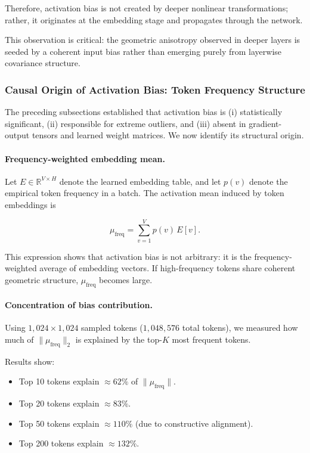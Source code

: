 Therefore, activation bias is not created by deeper nonlinear
transformations; rather, it originates at the embedding stage
and propagates through the network.

This observation is critical:
the geometric anisotropy observed in deeper layers is seeded
by a coherent input bias rather than emerging purely from
layerwise covariance structure.

\subsubsection{Causal Origin of Activation Bias: Token Frequency Structure}
\label{subsec:token_frequency_bias}

The preceding subsections established that activation bias is
(i) statistically significant,
(ii) responsible for extreme outliers,
and (iii) absent in gradient-output tensors and learned weight matrices.
We now identify its structural origin.

\paragraph{Frequency-weighted embedding mean.}

Let $E \in \mathbb{R}^{V \times H}$ denote the learned embedding table,
and let $p(v)$ denote the empirical token frequency in a batch.
The activation mean induced by token embeddings is

\[
\mu_{\text{freq}}
=
\sum_{v=1}^{V} p(v)\, E[v].
\]

This expression shows that activation bias is not arbitrary:
it is the frequency-weighted average of embedding vectors.
If high-frequency tokens share coherent geometric structure,
$\mu_{\text{freq}}$ becomes large.

\paragraph{Concentration of bias contribution.}

Using $1{,}024 \times 1{,}024$ sampled tokens
($1{,}048{,}576$ total tokens),
we measured how much of $\|\mu_{\text{freq}}\|_2$
is explained by the top-$K$ most frequent tokens.

Results show:

\begin{itemize}
\item Top 10 tokens explain $\approx 62\%$ of $\|\mu_{\text{freq}}\|$.
\item Top 20 tokens explain $\approx 83\%$.
\item Top 50 tokens explain $\approx 110\%$ (due to constructive alignment).
\item Top 200 tokens explain $\approx 132\%$.
\end{itemize}

